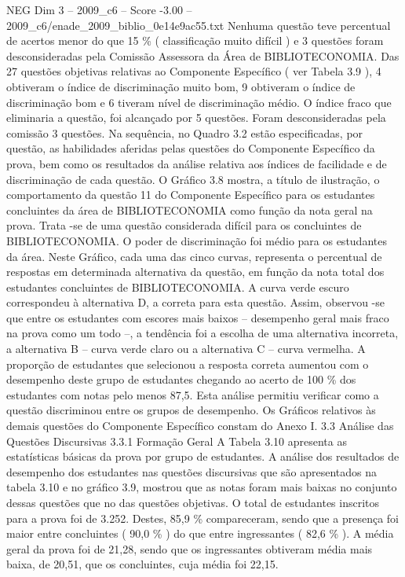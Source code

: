 \begin{textsample}{NEG Dim 3 – 2009\_c6 – Score -3.00 – 2009\_c6/enade\_2009\_biblio\_0e14e9ac55.txt}
Nenhuma questão teve percentual de acertos menor do que 15 \% ( classificação muito difícil ) e 3 questões foram desconsideradas pela Comissão Assessora da Área de BIBLIOTECONOMIA.
Das 27 questões objetivas relativas ao Componente Específico ( ver Tabela 3.9 ), 4 obtiveram o índice de discriminação muito bom, 9 obtiveram o índice de discriminação bom e 6 tiveram nível de discriminação médio.
O índice fraco que eliminaria a questão, foi alcançado por 5 questões.
Foram desconsideradas pela comissão 3 questões.
Na sequência, no Quadro 3.2 estão especificadas, por questão, as habilidades aferidas pelas questões do Componente Específico da prova, bem como os resultados da análise relativa aos índices de facilidade e de discriminação de cada questão.
O Gráfico 3.8 mostra, a título de ilustração, o comportamento da questão 11 do Componente Específico para os estudantes concluintes da área de BIBLIOTECONOMIA como função da nota geral na prova.
Trata -se de uma questão considerada difícil para os concluintes de BIBLIOTECONOMIA.
O poder de discriminação foi médio para os estudantes da área.
Neste Gráfico, cada uma das cinco curvas, representa o percentual de respostas em determinada alternativa da questão, em função da nota total dos estudantes concluintes de BIBLIOTECONOMIA.
A curva verde escuro correspondeu à alternativa D, a correta para esta questão.
Assim, observou -se que entre os estudantes com escores mais baixos – desempenho geral mais fraco na prova como um todo –, a tendência foi a escolha de uma alternativa incorreta, a alternativa B – curva verde claro ou a alternativa C – curva vermelha.
A proporção de estudantes que selecionou a resposta correta aumentou com o desempenho deste grupo de estudantes chegando ao acerto de 100 \% dos estudantes com notas pelo menos 87,5.
Esta análise permitiu verificar como a questão discriminou entre os grupos de desempenho.
Os Gráficos relativos às demais questões do Componente Específico constam do Anexo I. 3.3 Análise das Questões Discursivas 3.3.1 Formação Geral A Tabela 3.10 apresenta as estatísticas básicas da prova por grupo de estudantes.
A análise dos resultados de desempenho dos estudantes nas questões discursivas que são apresentados na tabela 3.10 e no gráfico 3.9, mostrou que as notas foram mais baixas no conjunto dessas questões que no das questões objetivas.
O total de estudantes inscritos para a prova foi de 3.252.
Destes, 85,9 \% compareceram, sendo que a presença foi maior entre concluintes ( 90,0 \% ) do que entre ingressantes ( 82,6 \% ).
A média geral da prova foi de 21,28, sendo que os ingressantes obtiveram média mais baixa, de 20,51, que os concluintes, cuja média foi 22,15.

\end{textsample}
